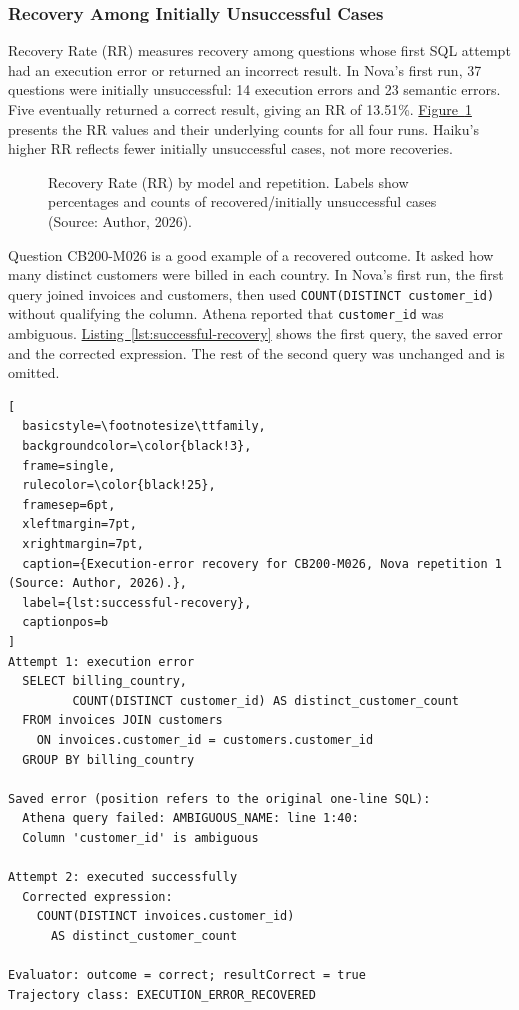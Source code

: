 \subsubsection{Recovery Among Initially Unsuccessful Cases}
\label{sec:results-initial-recovery}
Recovery Rate (RR) measures recovery among questions whose first SQL attempt
had an execution error or returned an incorrect result.
In Nova's first run, 37 questions were initially unsuccessful:
14 execution errors and 23 semantic errors. Five eventually returned a
correct result, giving an RR of 13.51\%.
\hyperref[fig:recovery-rates]{Figure~\ref*{fig:recovery-rates}} presents the
RR values and their underlying counts for all four runs.
Haiku's higher RR reflects fewer initially unsuccessful cases,
not more recoveries.

\begin{figure}[H]
\centering

\caption{Recovery Rate (RR) by model and repetition. 
Labels show percentages and counts of recovered/initially unsuccessful cases (Source: Author, 2026).}
\label{fig:recovery-rates}
\end{figure}

Question CB200-M026 is a good example of a recovered outcome. 
It asked how many distinct customers were billed in each country. 
In Nova's first run, the first query joined invoices and customers, 
then used \texttt{COUNT(DISTINCT customer\_id)} without qualifying the column.
Athena reported that \texttt{customer\_id} was ambiguous. 
\hyperref[lst:successful-recovery]{Listing~\ref*{lst:successful-recovery}}
shows the first query, the saved error and the corrected expression.
The rest of the second query was unchanged and is omitted.

\noindent\begin{minipage}{\linewidth}
\begin{lstlisting}[
  basicstyle=\footnotesize\ttfamily,
  backgroundcolor=\color{black!3},
  frame=single,
  rulecolor=\color{black!25},
  framesep=6pt,
  xleftmargin=7pt,
  xrightmargin=7pt,
  caption={Execution-error recovery for CB200-M026, Nova repetition 1 (Source: Author, 2026).},
  label={lst:successful-recovery},
  captionpos=b
]
Attempt 1: execution error
  SELECT billing_country,
         COUNT(DISTINCT customer_id) AS distinct_customer_count
  FROM invoices JOIN customers
    ON invoices.customer_id = customers.customer_id
  GROUP BY billing_country

Saved error (position refers to the original one-line SQL):
  Athena query failed: AMBIGUOUS_NAME: line 1:40:
  Column 'customer_id' is ambiguous

Attempt 2: executed successfully
  Corrected expression:
    COUNT(DISTINCT invoices.customer_id)
      AS distinct_customer_count

Evaluator: outcome = correct; resultCorrect = true
Trajectory class: EXECUTION_ERROR_RECOVERED
\end{lstlisting}
\end{minipage}

